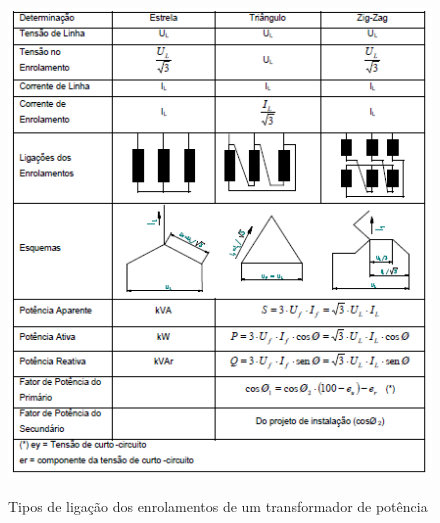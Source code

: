 \documentclass[a5paper]{ufsc-thesis}
\begin{document}
\begin{figure}[htb]
  \caption{Tipos de ligação dos enrolamentos de um transformador de potência}
  \centering
  \includegraphics[width=12cm]{tiposdenrol.jpg}
  \label{fig:tiposdenrol}
\end{figure}
\end{document}
